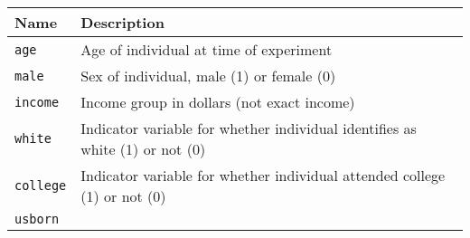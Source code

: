 \documentclass[]{article}
\begin{document}
\begin{longtable}[]{@{}ll@{}}
\toprule
\begin{minipage}[b]{0.25\columnwidth}\raggedright\strut
Name\strut
\end{minipage} & \begin{minipage}[b]{0.68\columnwidth}\raggedright\strut
Description\strut
\end{minipage}\tabularnewline
\midrule
\endhead
\begin{minipage}[t]{0.25\columnwidth}\raggedright\strut
\texttt{age}\strut
\end{minipage} & \begin{minipage}[t]{0.68\columnwidth}\raggedright\strut
Age of individual at time of experiment\strut
\end{minipage}\tabularnewline
\begin{minipage}[t]{0.25\columnwidth}\raggedright\strut
\texttt{male}\strut
\end{minipage} & \begin{minipage}[t]{0.68\columnwidth}\raggedright\strut
Sex of individual, male (1) or female (0)\strut
\end{minipage}\tabularnewline
\begin{minipage}[t]{0.25\columnwidth}\raggedright\strut
\texttt{income}\strut
\end{minipage} & \begin{minipage}[t]{0.68\columnwidth}\raggedright\strut
Income group in dollars (not exact income)\strut
\end{minipage}\tabularnewline
\begin{minipage}[t]{0.25\columnwidth}\raggedright\strut
\texttt{white}\strut
\end{minipage} & \begin{minipage}[t]{0.68\columnwidth}\raggedright\strut
Indicator variable for whether individual identifies as white (1) or not
(0)\strut
\end{minipage}\tabularnewline
\begin{minipage}[t]{0.25\columnwidth}\raggedright\strut
\texttt{college}\strut
\end{minipage} & \begin{minipage}[t]{0.68\columnwidth}\raggedright\strut
Indicator variable for whether individual attended college (1) or not
(0)\strut
\end{minipage}\tabularnewline
\begin{minipage}[t]{0.25\columnwidth}\raggedright\strut
\texttt{usborn}\strut
\end{minipage} & \begin{minipage}[t]{0.68\columnwidth}\raggedright\strut

\end{minipage}
\end{longtable}
\end{document}
